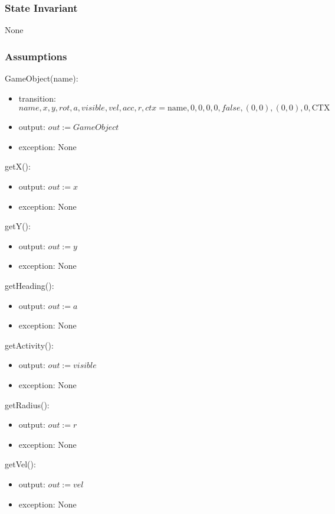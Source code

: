 \documentclass[12pt]{article}
\begin{document}
\subsubsection* {State Invariant}

None

\subsubsection* {Assumptions}

GameObject(name):
\begin{itemize}
    \item transition: $name, x, y, rot, a, visible, vel, acc, r, ctx = \mbox{name}, 0, 0, 0, 0, false, (0,0), (0,0), 0, \mbox{CTX}$
    \item output: $out := GameObject$
    \item exception: None
\end{itemize}

getX():
\begin{itemize}
    \item output: $out := x$
    \item exception: None
\end{itemize}

getY():
\begin{itemize}
    \item output: $out := y$
    \item exception: None
\end{itemize}

getHeading():
\begin{itemize}
    \item output: $out := a$
    \item exception: None
\end{itemize}

getActivity():
\begin{itemize}
    \item output: $out := visible$
    \item exception: None
\end{itemize}

getRadius():
\begin{itemize}
    \item output: $out := r$
    \item exception: None
\end{itemize}

getVel():
\begin{itemize}
    \item output: $out := vel$
    \item exception: None
\end{itemize}
\end{document}

